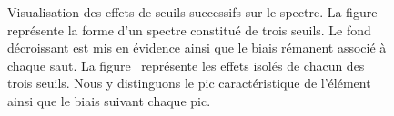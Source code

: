     \begin{figure}
        \centering
        \hspace{1em}
        \caption{Visualisation des effets de seuils successifs sur le spectre. La figure~ représente la forme d'un spectre constitué de trois seuils. Le fond décroissant est mis en évidence ainsi que le biais rémanent associé à chaque saut. La figure~ représente les effets isolés de chacun des trois seuils. Nous y distinguons le pic caractéristique de l'élément ainsi que le biais suivant chaque pic.
            \protect\label{fig-decroissance-spectre}}
    \end{figure}


